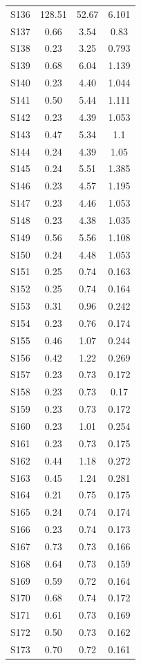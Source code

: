 {\begin{longtable}{l S[table-format=7.2] S[table-format=7.2] S[table-format=7.3]}
S136 & 128.51 & 52.67 & 6.101 \\
S137 & 0.66 & 3.54 & 0.83 \\
S138 & 0.23 & 3.25 & 0.793 \\
S139 & 0.68 & 6.04 & 1.139 \\
S140 & 0.23 & 4.40 & 1.044 \\
S141 & 0.50 & 5.44 & 1.111 \\
S142 & 0.23 & 4.39 & 1.053 \\
S143 & 0.47 & 5.34 & 1.1 \\
S144 & 0.24 & 4.39 & 1.05 \\
S145 & 0.24 & 5.51 & 1.385 \\
S146 & 0.23 & 4.57 & 1.195 \\
S147 & 0.23 & 4.46 & 1.053 \\
S148 & 0.23 & 4.38 & 1.035 \\
S149 & 0.56 & 5.56 & 1.108 \\
S150 & 0.24 & 4.48 & 1.053 \\
S151 & 0.25 & 0.74 & 0.163 \\
S152 & 0.25 & 0.74 & 0.164 \\
S153 & 0.31 & 0.96 & 0.242 \\
S154 & 0.23 & 0.76 & 0.174 \\
S155 & 0.46 & 1.07 & 0.244 \\
S156 & 0.42 & 1.22 & 0.269 \\
S157 & 0.23 & 0.73 & 0.172 \\
S158 & 0.23 & 0.73 & 0.17 \\
S159 & 0.23 & 0.73 & 0.172 \\
S160 & 0.23 & 1.01 & 0.254 \\
S161 & 0.23 & 0.73 & 0.175 \\
S162 & 0.44 & 1.18 & 0.272 \\
S163 & 0.45 & 1.24 & 0.281 \\
S164 & 0.21 & 0.75 & 0.175 \\
S165 & 0.24 & 0.74 & 0.174 \\
S166 & 0.23 & 0.74 & 0.173 \\
S167 & 0.73 & 0.73 & 0.166 \\
S168 & 0.64 & 0.73 & 0.159 \\
S169 & 0.59 & 0.72 & 0.164 \\
S170 & 0.68 & 0.74 & 0.172 \\
S171 & 0.61 & 0.73 & 0.169 \\
S172 & 0.50 & 0.73 & 0.162 \\
S173 & 0.70 & 0.72 & 0.161 \\

\end{longtable}}
